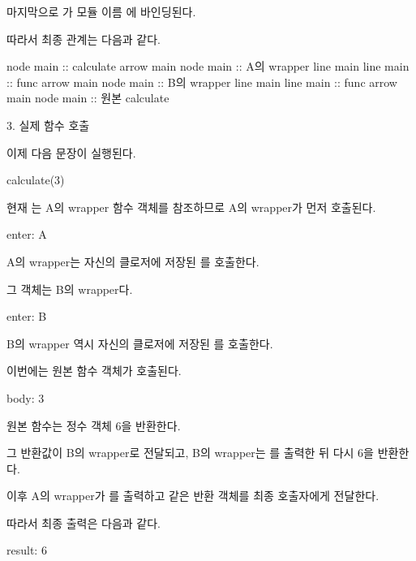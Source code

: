 마지막으로 가 모듈 이름 에 바인딩된다.

따라서 최종 관계는 다음과 같다.

\begin{dhkbranch}[in=8]
node main :: calculate
arrow main
node main :: A의 wrapper
line main
line main :: func
arrow main
node main :: B의 wrapper
line main
line main :: func
arrow main
node main :: 원본 calculate
\end{dhkbranch}

\begin{dhknote}
\begin{dhksmry}[centered]
3. 실제 함수 호출
\end{dhksmry}
\end{dhknote}

이제 다음 문장이 실행된다.

\begin{dhkcode}
calculate(3)
\end{dhkcode}

현재 는 A의 wrapper 함수 객체를 참조하므로 A의 wrapper가 먼저 호출된다.

\begin{dhkzsh}
enter: A
\end{dhkzsh}

A의 wrapper는 자신의 클로저에 저장된 를 호출한다.

그 객체는 B의 wrapper다.

\begin{dhkzsh}
enter: B
\end{dhkzsh}

B의 wrapper 역시 자신의 클로저에 저장된 를 호출한다.

이번에는 원본  함수 객체가 호출된다.

\begin{dhkzsh}
body: 3
\end{dhkzsh}

원본 함수는 정수 객체 6을 반환한다.

그 반환값이 B의 wrapper로 전달되고, B의 wrapper는 를 출력한 뒤 다시 6을 반환한다.

이후 A의 wrapper가 를 출력하고 같은 반환 객체를 최종 호출자에게 전달한다.

따라서 최종 출력은 다음과 같다.

\begin{dhkzsh}
result: 6
\end{dhkzsh}

